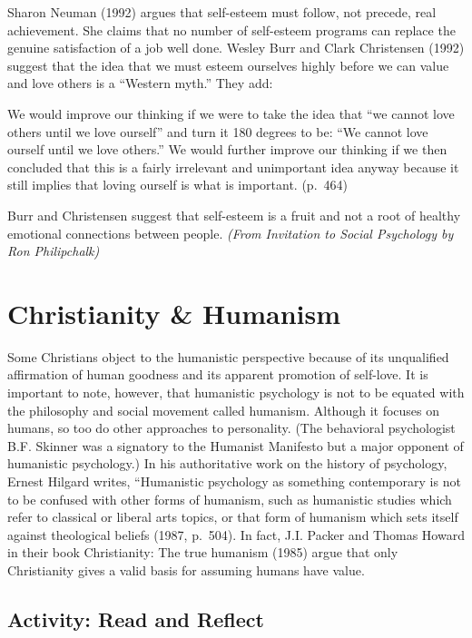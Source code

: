\documentclass[
]{book}
\begin{document}
Sharon Neuman (1992) argues that self-esteem must follow, not precede, real achievement. She claims that no number of self-esteem programs can replace the genuine satisfaction of a job well done. Wesley Burr and Clark Christensen (1992) suggest that the idea that we must esteem ourselves highly before we can value and love others is a ``Western myth.'' They add:

We would improve our thinking if we were to take the idea that ``we cannot love others until we love ourself'' and turn it 180 degrees to be: ``We cannot love ourself until we love others.'' We would further improve our thinking if we then concluded that this is a fairly irrelevant and unimportant idea anyway because it still implies that loving ourself is what is important. (p.~464)

Burr and Christensen suggest that self-esteem is a fruit and not a root of healthy emotional connections between people. \emph{(From Invitation to Social Psychology by Ron Philipchalk)}

\hypertarget{christianity-humanism}{%
\section{Christianity \& Humanism}\label{christianity-humanism}}

Some Christians object to the humanistic perspective because of its unqualified affirmation of human goodness and its apparent promotion of self-love. It is important to note, however, that humanistic psychology is not to be equated with the philosophy and social movement called humanism. Although it focuses on humans, so too do other approaches to personality. (The behavioral psychologist B.F. Skinner was a signatory to the Humanist Manifesto but a major opponent of humanistic psychology.) In his authoritative work on the history of psychology, Ernest Hilgard writes, ``Humanistic psychology as something contemporary is not to be confused with other forms of humanism, such as humanistic studies which refer to classical or liberal arts topics, or that form of humanism which sets itself against theological beliefs (1987, p.~504). In fact, J.I. Packer and Thomas Howard in their book Christianity: The true humanism (1985) argue that only Christianity gives a valid basis for assuming humans have value.

\hypertarget{activity-read-and-reflect-3}{%
\subsection*{Activity: Read and Reflect}\label{activity-read-and-reflect-3}}
\end{document}
